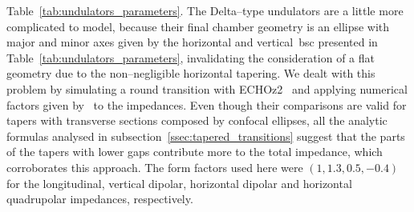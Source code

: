     Table~\ref{tab:undulators_parameters}. The Delta--type undulators are a little more complicated to model, because their final chamber geometry is an ellipse with major and minor axes given by the horizontal and vertical~\gls{bsc} presented in Table~\ref{tab:undulators_parameters}, invalidating the consideration of a flat geometry due to the non--negligible horizontal tapering. We dealt with this problem by simulating a round transition with ECHOz2~\cite{Zagorodnov2005} and applying numerical factors given by~ to the impedances.
    Even though their comparisons are valid for tapers with transverse sections composed by confocal ellipses, all the analytic formulas analysed in subsection~\ref{ssec:tapered_transitions} suggest that the parts of the tapers with lower gaps contribute more to the total impedance, which corroborates this approach. The form factors used here were $(1,1.3,0.5,-0.4)$ for the longitudinal, vertical dipolar, horizontal dipolar and horizontal quadrupolar impedances, respectively.

